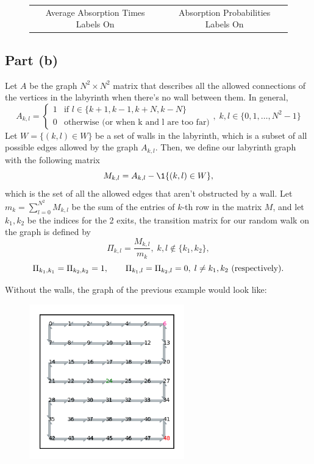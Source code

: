 \begin{figure}[H]
\begin{tabular}{cc}
    Average Absorption Times Labels On & Absorption Probabilities Labels On \\[6pt]
    \end{tabular}
\end{figure}

\subsection*{Part (b)}

Let $A$ be the graph $N^2\times N^2$ matrix that describes all the allowed connections of the vertices in the labyrinth when there's no wall between them. In general,
\[ A_{k,l} = \begin{cases}
    1 & \mbox{if } l \in \{k+1,k-1,k+N, k-N\}\\
    0 & \mbox{otherwise (or when k and l are too far)}
\end{cases},\; k,l \in \{0,1,\ldots,N^2-1\} \]    
Let $W = \{(k,l) \in W\}$ be a set of walls in the labyrinth, which is a subset of all possible edges allowed by the graph $A_{k,l}$. Then, we define our labyrinth graph with the following matrix
\[ M_{k,l} = A_{k,l} - \1\{(k,l)\in W\},\]
which is the set of all the allowed edges that aren't obstructed by a wall. Let $m_k = \sum_{l = 0}^{N^2}M_{k,l}$ be the sum of the entries of $k$-th row in the matrix $M$, and let $k_1, k_2$ be the indices for the 2 exits, the transition matrix for our random walk on the graph is defined by
\[ \Pi_{k,l} = \frac{M_{k,l}}{m_k}, \; k,l \not\in \{k_1,k_2\}, \]
\[ \Pi_{k_1,k_1} = \Pi_{k_2,k_2} = 1,\hspace*{2em} \Pi_{k_1,l} = \Pi_{k_2,l} = 0,\; l\neq k_1,k_2\mbox{ (respectively)}. \]

Without the walls, the graph of the previous example would look like:
\begin{figure}[H]
    \centering
    \includegraphics[width=0.6\textwidth]{../pictures/216-4.png}
\end{figure}

